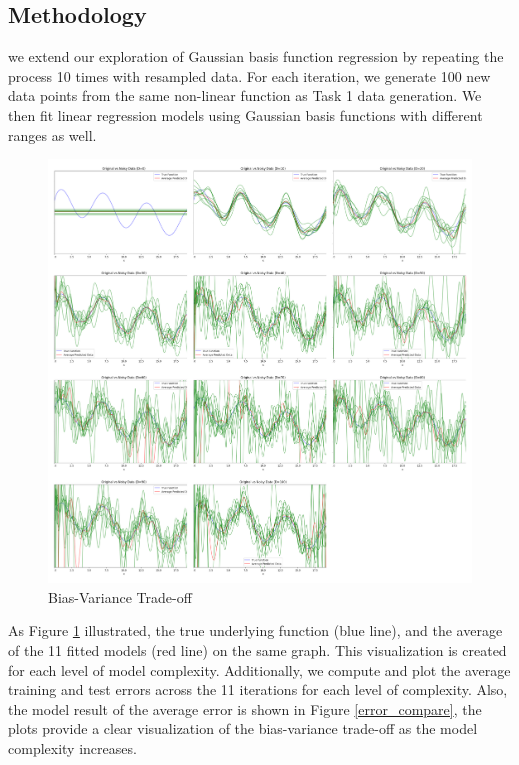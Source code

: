 \documentclass{article}
\begin{document}
\subsection{Methodology}
we extend our exploration of Gaussian basis function regression by repeating the process 10 times with resampled data. For each iteration, we generate 100 new data points from the same non-linear function as Task 1 data generation. We then fit linear regression models using Gaussian basis functions with different ranges as well.

\begin{figure}[H]
    \centering
    \includegraphics[width=1\linewidth,height=0.3\textheight]{figures/bias_variance.jpg} 
    \caption{Bias-Variance Trade-off}
    \label{bias_variance}
\end{figure}

As Figure \ref{bias_variance} illustrated, the true underlying function (blue line), and the average of the 11 fitted models (red line) on the same graph. This visualization is created for each level of model complexity. Additionally, we compute and plot the average training and test errors across the 11 iterations for each level of complexity. Also, the model result of the average error is shown in Figure \ref{error_compare}, the plots provide a clear visualization of the bias-variance trade-off as the model complexity increases. 
\end{document}
